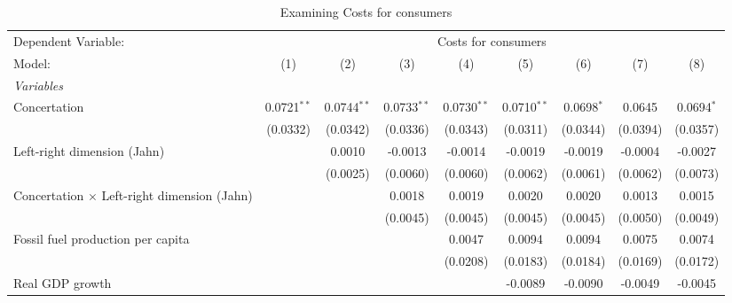 
\begin{table}[htbp]
   \caption{Examining Costs for consumers}
   \centering
   \begin{tabular}{lcccccccc}
      \tabularnewline \midrule \midrule
      Dependent Variable: & \multicolumn{8}{c}{Costs for consumers}\\
      Model:                                             & (1)           & (2)           & (3)           & (4)           & (5)           & (6)          & (7)      & (8)\\  
      \midrule
      \emph{Variables}\\
      Concertation                                       & 0.0721$^{**}$ & 0.0744$^{**}$ & 0.0733$^{**}$ & 0.0730$^{**}$ & 0.0710$^{**}$ & 0.0698$^{*}$ & 0.0645   & 0.0694$^{*}$\\   
                                                         & (0.0332)      & (0.0342)      & (0.0336)      & (0.0343)      & (0.0311)      & (0.0344)     & (0.0394) & (0.0357)\\   
      Left-right dimension (Jahn)                        &               & 0.0010        & -0.0013       & -0.0014       & -0.0019       & -0.0019      & -0.0004  & -0.0027\\   
                                                         &               & (0.0025)      & (0.0060)      & (0.0060)      & (0.0062)      & (0.0061)     & (0.0062) & (0.0073)\\   
      Concertation $\times$ Left-right dimension (Jahn)  &               &               & 0.0018        & 0.0019        & 0.0020        & 0.0020       & 0.0013   & 0.0015\\   
                                                         &               &               & (0.0045)      & (0.0045)      & (0.0045)      & (0.0045)     & (0.0050) & (0.0049)\\   
      Fossil fuel production per capita                  &               &               &               & 0.0047        & 0.0094        & 0.0094       & 0.0075   & 0.0074\\   
                                                         &               &               &               & (0.0208)      & (0.0183)      & (0.0184)     & (0.0169) & (0.0172)\\   
      Real GDP growth                                    &               &               &               &               & -0.0089       & -0.0090      & -0.0049  & -0.0045\\   

\end{tabular}
\end{table}
